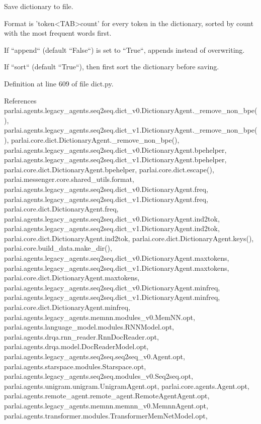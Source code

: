 \begin{DoxyVerb}Save dictionary to file.

Format is 'token<TAB>count' for every token in the dictionary, sorted
by count with the most frequent words first.

If ``append`` (default ``False``) is set to ``True``, appends instead of
overwriting.

If ``sort`` (default ``True``), then first sort the dictionary before saving.
\end{DoxyVerb}
 

Definition at line 609 of file dict.\+py.



References parlai.\+agents.\+legacy\+\_\+agents.\+seq2seq.\+dict\+\_\+v0.\+Dictionary\+Agent.\+\_\+remove\+\_\+non\+\_\+bpe(), parlai.\+agents.\+legacy\+\_\+agents.\+seq2seq.\+dict\+\_\+v1.\+Dictionary\+Agent.\+\_\+remove\+\_\+non\+\_\+bpe(), parlai.\+core.\+dict.\+Dictionary\+Agent.\+\_\+remove\+\_\+non\+\_\+bpe(), parlai.\+agents.\+legacy\+\_\+agents.\+seq2seq.\+dict\+\_\+v0.\+Dictionary\+Agent.\+bpehelper, parlai.\+agents.\+legacy\+\_\+agents.\+seq2seq.\+dict\+\_\+v1.\+Dictionary\+Agent.\+bpehelper, parlai.\+core.\+dict.\+Dictionary\+Agent.\+bpehelper, parlai.\+core.\+dict.\+escape(), parlai.\+messenger.\+core.\+shared\+\_\+utils.\+format, parlai.\+agents.\+legacy\+\_\+agents.\+seq2seq.\+dict\+\_\+v0.\+Dictionary\+Agent.\+freq, parlai.\+agents.\+legacy\+\_\+agents.\+seq2seq.\+dict\+\_\+v1.\+Dictionary\+Agent.\+freq, parlai.\+core.\+dict.\+Dictionary\+Agent.\+freq, parlai.\+agents.\+legacy\+\_\+agents.\+seq2seq.\+dict\+\_\+v0.\+Dictionary\+Agent.\+ind2tok, parlai.\+agents.\+legacy\+\_\+agents.\+seq2seq.\+dict\+\_\+v1.\+Dictionary\+Agent.\+ind2tok, parlai.\+core.\+dict.\+Dictionary\+Agent.\+ind2tok, parlai.\+core.\+dict.\+Dictionary\+Agent.\+keys(), parlai.\+core.\+build\+\_\+data.\+make\+\_\+dir(), parlai.\+agents.\+legacy\+\_\+agents.\+seq2seq.\+dict\+\_\+v0.\+Dictionary\+Agent.\+maxtokens, parlai.\+agents.\+legacy\+\_\+agents.\+seq2seq.\+dict\+\_\+v1.\+Dictionary\+Agent.\+maxtokens, parlai.\+core.\+dict.\+Dictionary\+Agent.\+maxtokens, parlai.\+agents.\+legacy\+\_\+agents.\+seq2seq.\+dict\+\_\+v0.\+Dictionary\+Agent.\+minfreq, parlai.\+agents.\+legacy\+\_\+agents.\+seq2seq.\+dict\+\_\+v1.\+Dictionary\+Agent.\+minfreq, parlai.\+core.\+dict.\+Dictionary\+Agent.\+minfreq, parlai.\+agents.\+legacy\+\_\+agents.\+memnn.\+modules\+\_\+v0.\+Mem\+N\+N.\+opt, parlai.\+agents.\+language\+\_\+model.\+modules.\+R\+N\+N\+Model.\+opt, parlai.\+agents.\+drqa.\+rnn\+\_\+reader.\+Rnn\+Doc\+Reader.\+opt, parlai.\+agents.\+drqa.\+model.\+Doc\+Reader\+Model.\+opt, parlai.\+agents.\+legacy\+\_\+agents.\+seq2seq.\+seq2seq\+\_\+v0.\+Agent.\+opt, parlai.\+agents.\+starspace.\+modules.\+Starspace.\+opt, parlai.\+agents.\+legacy\+\_\+agents.\+seq2seq.\+modules\+\_\+v0.\+Seq2seq.\+opt, parlai.\+agents.\+unigram.\+unigram.\+Unigram\+Agent.\+opt, parlai.\+core.\+agents.\+Agent.\+opt, parlai.\+agents.\+remote\+\_\+agent.\+remote\+\_\+agent.\+Remote\+Agent\+Agent.\+opt, parlai.\+agents.\+legacy\+\_\+agents.\+memnn.\+memnn\+\_\+v0.\+Memnn\+Agent.\+opt, parlai.\+agents.\+transformer.\+modules.\+Transformer\+Mem\+Net\+Model.\+opt, 